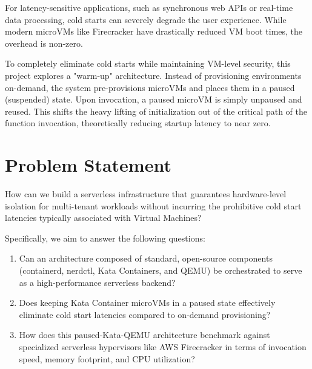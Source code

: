 For latency-sensitive applications, such as synchronous web APIs or real-time data processing, cold starts can severely degrade the user experience. While modern microVMs like Firecracker have drastically reduced VM boot times, the overhead is non-zero.

To completely eliminate cold starts while maintaining VM-level security, this project explores a "warm-up" architecture. Instead of provisioning environments on-demand, the system pre-provisions microVMs and places them in a paused (suspended) state. Upon invocation, a paused microVM is simply unpaused and reused. This shifts the heavy lifting of initialization out of the critical path of the function invocation, theoretically reducing startup latency to near zero.

\section{Problem Statement}
How can we build a serverless infrastructure that guarantees hardware-level isolation for multi-tenant workloads without incurring the prohibitive cold start latencies typically associated with Virtual Machines?

Specifically, we aim to answer the following questions:
\begin{enumerate}
    \item Can an architecture composed of standard, open-source components (containerd, nerdctl, Kata Containers, and QEMU) be orchestrated to serve as a high-performance serverless backend?
    \item Does keeping Kata Container microVMs in a paused state effectively eliminate cold start latencies compared to on-demand provisioning?
    \item How does this paused-Kata-QEMU architecture benchmark against specialized serverless hypervisors like AWS Firecracker in terms of invocation speed, memory footprint, and CPU utilization?
\end{enumerate}

